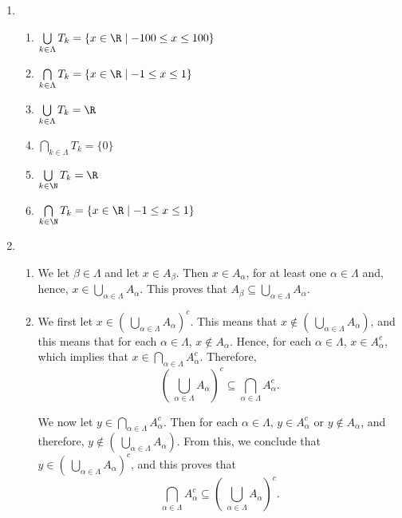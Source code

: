 \begin{enumerate}
\begin{multicols}{2}
\begin{enumerate}
\item $\bigcup\limits_{j \in \N}^{}A_j = \N$
\end{enumerate}
\end{multicols}


\item \begin{enumerate}
\item $\bigcup\limits_{k \in \Lambda}^{}T_k = \{ x \in \R \mid -100 \leq x \leq 100 \}$

\item $\bigcap\limits_{k \in \Lambda}^{}T_k = \{ x \in \R \mid -1 \leq x \leq 1 \}$

\item $\bigcup\limits_{k \in \Lambda}^{}T_k = \R$

\item $\bigcap\limits_{k \in \Lambda}^{}T_k = \{ 0 \}$

\item $\bigcup\limits_{k \in \N}^{}T_k = \R$

\item $\bigcap\limits_{k \in \N}^{}T_k = \{ x \in \R \mid -1 \leq x \leq 1 \}$
\end{enumerate}


\item \begin{enumerate}
\item We let $\beta \in \Lambda$ and let $x \in A_\beta$.  Then $x \in A_\alpha$, for at least one 
$\alpha \in \Lambda$ and, hence, 
$x \in \bigcup\limits_{\alpha \in \Lambda}^{}A_\alpha$.  This proves that 
$A_\beta \subseteq \bigcup\limits_{\alpha \in \Lambda}^{}A_\alpha$.

\item We first let 
$x \in \left(\:\bigcup\limits_{\alpha \in \Lambda}^{}A_\alpha \right)^c$.  This means that $x \notin \left(\:\bigcup\limits_{\alpha \in \Lambda}^{}A_\alpha \right)$, and this means that for each $\alpha \in \Lambda$, $x \notin A_{\alpha}$.  Hence, for each $\alpha \in \Lambda$, $x \in A_{\alpha}^c$, which implies that 
$x \in \bigcap\limits_{\alpha \in \Lambda}^{}A_{\alpha}^c$.  Therefore, 
\[
\left(\:\bigcup\limits_{\alpha \in \Lambda}^{}A_\alpha \right)^c \subseteq \bigcap\limits_{\alpha \in \Lambda}^{}A_{\alpha}^c.
\]

We now let $y \in \bigcap\limits_{\alpha \in \Lambda}^{}A_{\alpha}^c$.  Then for each 
$\alpha \in \Lambda$, $y \in A_{\alpha}^c$ or $y \notin A_{\alpha}$, and therefore, 
$y \notin \left(\:\bigcup\limits_{\alpha \in \Lambda}^{}A_\alpha \right)$.  From this, we conclude that \linebreak
$y \in \left(\:\bigcup\limits_{\alpha \in \Lambda}^{}A_\alpha \right)^c$, and this proves that
\[
\bigcap\limits_{\alpha \in \Lambda}^{}A_{\alpha}^c \subseteq \left(\:\bigcup\limits_{\alpha \in \Lambda}^{}A_\alpha \right)^c.
\]
\end{enumerate}




\end{enumerate}
